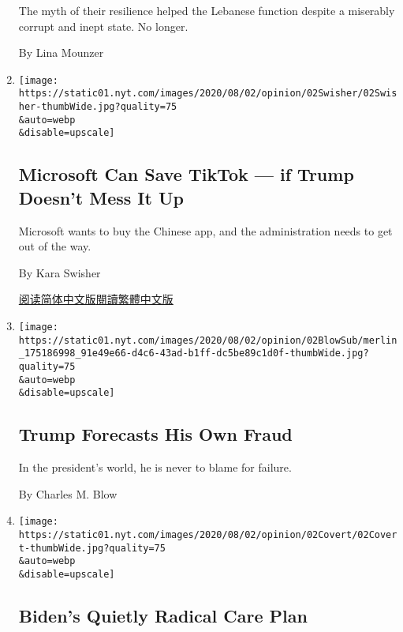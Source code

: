 \begin{enumerate}
  The myth of their resilience helped the Lebanese function despite a
  miserably corrupt and inept state. No longer.

  By Lina Mounzer
\item
  \href{/2020/08/02/opinion/02tik-tok-china-trump.html}{}

  \texttt{[image: https://static01.nyt.com/images/2020/08/02/opinion/02Swisher/02Swisher-thumbWide.jpg?quality=75\\\&auto=webp\\\&disable=upscale]}

  \hypertarget{microsoft-can-save-tiktok--if-trump-doesnt-mess-it-up}{%
  \subsection{Microsoft Can Save TikTok --- if Trump Doesn't Mess It
  Up}\label{microsoft-can-save-tiktok--if-trump-doesnt-mess-it-up}}

  Microsoft wants to buy the Chinese app, and the administration needs
  to get out of the way.

  By Kara Swisher

  \href{https://cn.nytimes.com/opinion/20200804/tik-tok-china-trump/}{阅读简体中文版}\href{https://cn.nytimes.com/opinion/20200804/tik-tok-china-trump/zh-hant/}{閱讀繁體中文版}
\item
  \href{/2020/08/02/opinion/trump-2020-election.html}{}

  \texttt{[image: https://static01.nyt.com/images/2020/08/02/opinion/02BlowSub/merlin\_175186998\_91e49e66-d4c6-43ad-b1ff-dc5be89c1d0f-thumbWide.jpg?quality=75\\\&auto=webp\\\&disable=upscale]}

  \hypertarget{trump-forecasts-his-own-fraud}{%
  \subsection{Trump Forecasts His Own
  Fraud}\label{trump-forecasts-his-own-fraud}}

  In the president's world, he is never to blame for failure.

  By Charles M. Blow
\item
  \href{/2020/08/02/opinion/biden-child-care.html}{}

  \texttt{[image: https://static01.nyt.com/images/2020/08/02/opinion/02Covert/02Covert-thumbWide.jpg?quality=75\\\&auto=webp\\\&disable=upscale]}

  \hypertarget{bidens-quietly-radical-care-plan}{%
  \subsection{Biden's Quietly Radical Care
  Plan}\label{bidens-quietly-radical-care-plan}}


\end{enumerate}
